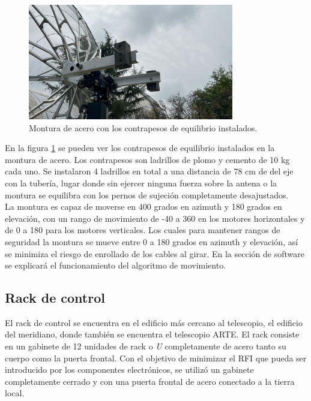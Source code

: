 \begin{figure}
    \centering
    \includegraphics[width=0.8\textwidth]{img/contrapesos}
    \caption{Montura de acero con los contrapesos de equilibrio instalados.}
    \label{fig:ensamble11}
\end{figure}

En la figura \ref{fig:ensamble11} se pueden ver los contrapesos de equilibrio instalados en la montura de acero. Los contrapesos son ladrillos de plomo y cemento de 10 kg cada uno. Se instalaron 4 ladrillos en total a una distancia de 78 cm de del eje con la tubería, lugar donde sin ejercer ninguna fuerza sobre la antena o la montura se equilibra con los pernos de sujeción completamente desajustados.\\

La montura es capaz de moverse en 400 grados en azimuth y 180 grados en elevación, con un rango de movimiento de -40 a 360 en los motores horizontales y de 0 a 180 para los motores verticales. Los cuales para mantener rangos de seguridad la montura se mueve entre 0 a 180 grados en azimuth y elevación, así se minimiza el riesgo de enrollado de los cables al girar. En la sección de software se explicará el funcionamiento del algoritmo de movimiento.\\

\subsection{Rack de control}

El rack de control se encuentra en el edificio más cercano al telescopio, el edificio del meridiano, donde también se encuentra el telescopio ARTE. El rack consiste en un gabinete de 12 unidades de rack o \textit{U} completamente de acero tanto su cuerpo como la puerta frontal. Con el objetivo de minimizar el RFI que pueda ser introducido por los componentes electrónicos, se utilizó un gabinete completamente cerrado y con una puerta frontal de acero conectado a la tierra local.\\


